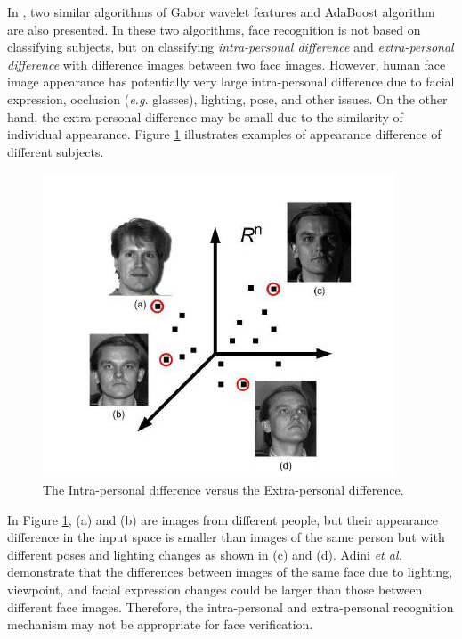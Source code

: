In \cite{Shen2006,Yang2004fg}, two similar algorithms of Gabor wavelet features and AdaBoost algorithm are also presented. In these two algorithms, face recognition is not based on classifying subjects, but on classifying \textit{intra-personal difference} and \textit{extra-personal difference} \cite{Moghaddam1997} with difference images between two face images. However, human face image appearance has potentially very large intra-personal difference due to facial expression, occlusion (\textit{e.g.} glasses), lighting, pose, and other issues. On the other hand, the extra-personal difference may be small due to the similarity of individual appearance. \mbox{Figure} \ref{fig:intravsextra} illustrates examples of appearance difference of different subjects. 
\begin{figure}[ht]
 \begin{center}
  \includegraphics[scale=0.77]{ch5/figures/intravsextra}
  \caption{The Intra-personal difference versus the Extra-personal difference. \cite{Lu2006}}
  \label{fig:intravsextra}
 \end{center}
\end{figure} 
In \mbox{Figure} \ref{fig:intravsextra}, (a) and (b) are images from different people, but their appearance difference in the input space is smaller than images of the same person but with different poses and lighting changes as shown in (c) and (d). Adini \textit{et al.} \cite{Adini1997} demonstrate that the differences between images of the same face due to lighting, viewpoint, and facial expression changes could be larger than those between different face images. Therefore, the intra-personal and extra-personal recognition mechanism may not be appropriate for face verification.

